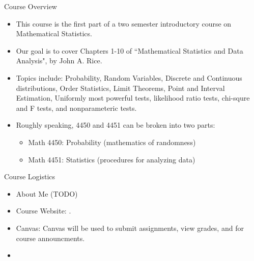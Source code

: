 \begin{frame}{Course Overview}
  \begin{itemize}
  \item This course is the first part of a two semester introductory course on Mathematical Statistics.
  \item Our goal is to cover Chapters 1-10 of ``Mathematical Statistics and Data Analysis", by John A. Rice.
  \item Topics include: Probability, Random Variables, Discrete and Continuous distributions, Order Statistics, Limit Theorems, Point and Interval Estimation, Uniformly most powerful tests, likelihood ratio tests, chi-squre and F tests, and nonparameteric tests.
  \item Roughly speaking, 4450 and 4451 can be broken into two parts: 
  \begin{itemize}
    \item Math 4450: Probability (mathematics of randomness)
    \item Math 4451: Statistics (procedures for analyzing data)
  \end{itemize}
  \end{itemize}
\end{frame}

\begin{frame}{Course Logistics}
  \begin{itemize}
    \item About Me (TODO)
    \item Course Website: . 
    \item Canvas: Canvas will be used to submit assignments, view grades, and for course announcments.
    \item {}
  \end{itemize}
\end{frame}

